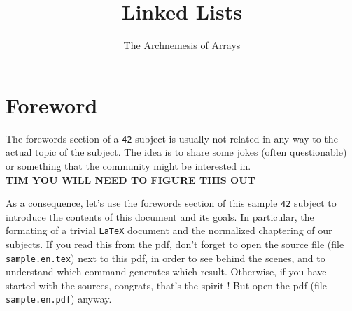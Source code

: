\documentclass{42-en}
\begin{document}
                           \title{Linked Lists}
                          \subtitle{The Archnemesis of Arrays}


\maketitle

\tableofcontents


\chapter{Foreword}

    The forewords section of a \texttt{42} subject is usually not
    related in any way to the actual topic of the subject. The idea is
    to share some jokes (often questionable) or something that the
    community might be interested in.\\


    \textbf{TIM YOU WILL NEED TO FIGURE THIS OUT}







    As a consequence, let's use the forewords section of this sample
    \texttt{42} subject to introduce the contents of this document and
    its goals. In particular, the formating of a trivial
    \texttt{LaTeX} document and the normalized chaptering of our
    subjects. If you read this from the pdf, don't forget to open the
    source file (file \texttt{sample.en.tex}) next to this pdf, in
    order to see behind the scenes, and to understand which command
    generates which result. Otherwise, if you have started with the
    sources, congrats, that's the spirit ! But open the pdf (file
    \texttt{sample.en.pdf}) anyway.\\
\end{document}
